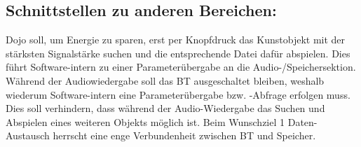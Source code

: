 \subsection{Schnittstellen zu anderen Bereichen:}
Dojo soll, um Energie zu sparen, erst per Knopfdruck das Kunstobjekt mit der stärksten Signalstärke suchen und die entsprechende Datei dafür abspielen. Dies führt Software-intern zu einer Parameterübergabe an die Audio-/Speichersektion. Während der Audiowiedergabe soll das BT ausgeschaltet bleiben, weshalb wiederum Software-intern eine Parameterübergabe bzw. -Abfrage erfolgen muss. Dies soll verhindern, dass während der Audio-Wiedergabe das Suchen und Abspielen eines weiteren Objekts möglich ist. Beim Wunschziel 1 Daten-Austausch herrscht eine enge Verbundenheit zwischen BT und Speicher. 
